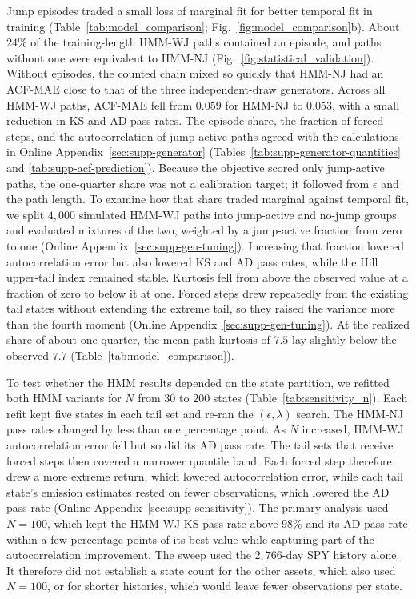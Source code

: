 Jump episodes traded a small loss of marginal fit for better temporal
fit in training (Table~\ref{tab:model_comparison};
Fig.~\ref{fig:model_comparison}b). About $24\%$ of the
training-length HMM-WJ paths contained an episode, and paths without
one were equivalent to HMM-NJ (Fig.~\ref{fig:statistical_validation}).
Without episodes, the counted chain mixed so quickly that HMM-NJ had
an ACF-MAE close to that of the three independent-draw generators.
Across all HMM-WJ paths, ACF-MAE fell from $0.059$ for HMM-NJ to
$0.053$, with a small reduction in KS and AD pass rates. The episode
share, the fraction of forced steps, and the autocorrelation of
jump-active paths agreed with the calculations in Online
Appendix~\ref{sec:supp-generator}
(Tables~\ref{tab:supp-generator-quantities} and
\ref{tab:supp-acf-prediction}). Because the objective scored only
jump-active paths, the one-quarter share was not a calibration target;
it followed from $\epsilon$ and the path length. To examine how that share traded marginal against temporal fit, we
split $4{,}000$ simulated HMM-WJ paths into jump-active and no-jump
groups and evaluated mixtures of the two, weighted by a jump-active
fraction from zero to one (Online Appendix~\ref{sec:supp-gen-tuning}). Increasing that fraction lowered autocorrelation
error but also lowered KS and AD pass rates, while the Hill upper-tail
index remained stable. Kurtosis fell from above the observed value at
a fraction of zero to below it at one. Forced steps drew repeatedly
from the existing tail states without extending the extreme tail, so
they raised the variance more than the fourth moment (Online
Appendix~\ref{sec:supp-gen-tuning}). At the realized share of about one quarter, the mean path kurtosis of
$7.5$ lay slightly below the observed $7.7$
(Table~\ref{tab:model_comparison}).

To test whether the HMM results depended on the state partition, we
refitted both HMM variants for $N$ from $30$ to $200$ states
(Table~\ref{tab:sensitivity_n}). Each refit kept five states in each
tail set and re-ran the $(\epsilon,\lambda)$ search. The HMM-NJ pass
rates changed by less than one percentage point. As $N$ increased,
HMM-WJ autocorrelation error fell but so did its AD pass rate. The
tail sets that receive forced steps then covered a narrower quantile
band. Each forced step therefore drew a more extreme return, which
lowered autocorrelation error, while each tail state's emission
estimates rested on fewer observations, which lowered the AD pass rate
(Online Appendix~\ref{sec:supp-sensitivity}). The primary analysis used
$N=100$, which kept the HMM-WJ KS pass rate above $98\%$ and its AD
pass rate within a few percentage points of its best value while
capturing part of the autocorrelation improvement. The sweep used the
$2{,}766$-day SPY history alone. It therefore did not establish a state
count for the other assets, which also used $N=100$, or for shorter
histories, which would leave fewer observations per state.

